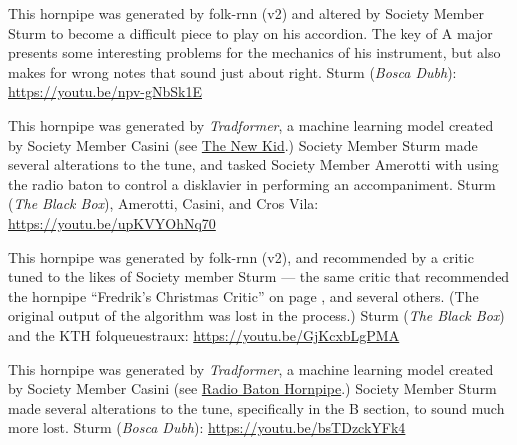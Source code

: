 \documentclass[a4paper,notitlepage,twoside]{book}
\begin{document}
\clearpage
{}
{}  
  
\hypertarget{hornpipe:DogintheBog}{}
This hornpipe was generated by folk-rnn (v2) and
altered by Society Member Sturm to become a difficult piece to play
on his accordion.
The key of A major presents some interesting problems for the mechanics
of his instrument, but also makes for wrong notes that sound just about right.
Sturm ({\em Bosca Dubh}): \url{https://youtu.be/npv-gNbSk1E}

\clearpage
{}
{}  
  
\hypertarget{hornpipe:RadioBatonHornpipe}{}
This hornpipe was generated by {\em Tradformer}, 
a machine learning model created by Society Member Casini
(see \hyperlink{jig:NewKid}{The New Kid}.)
Society Member Sturm made several alterations to the tune,
and tasked Society Member Amerotti with using the radio baton
to control a disklavier in performing an accompaniment.
Sturm ({\em The Black Box}), Amerotti, Casini, and Cros Vila: \url{https://youtu.be/upKVYOhNq70}

{}  
  
\hypertarget{hornpipe:TidforJul}{}
This hornpipe was generated by folk-rnn (v2), 
and recommended by a critic tuned to the likes of 
Society member Sturm --- the same critic that recommended
the hornpipe ``Fredrik's Christmas Critic'' on page \pageref{hornpipe:FredriksChristmasCritic},
and several others.
(The original output of the algorithm was lost in the process.)
Sturm ({\em The Black Box}) and the KTH folqueuestraux: \url{https://youtu.be/GjKcxbLgPMA}

{}  
  
\hypertarget{hornpipe:BellySpooks}{}
This hornpipe was generated by {\em Tradformer}, 
a machine learning model created by Society Member Casini
(see \hyperlink{hornpipe:RadioBatonHornpipe}{Radio Baton Hornpipe}.)
Society Member Sturm made several alterations to the tune,
specifically in the B section, to sound much more lost.
Sturm ({\em Bosca Dubh}): \url{https://youtu.be/bsTDzckYFk4}
\end{document}
